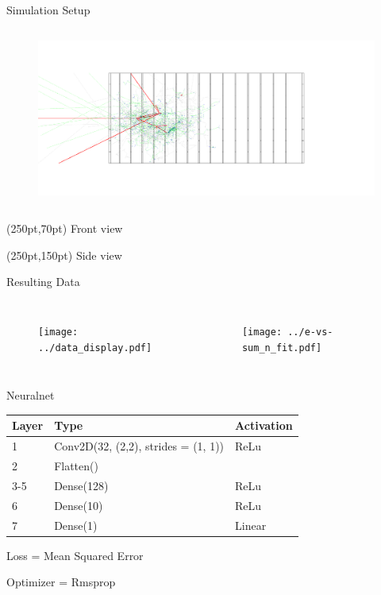 \documentclass[10pt]{beamer}
\begin{document}
\begin{frame}{Simulation Setup}
\begin{columns}
\begin{figure}[htp]
      \includegraphics[width=1.1\textwidth]{side.png}
    \end{figure}
  \end{columns}
  \begin{textblock*}{100pt}(250pt,70pt)
    Front view
  \end{textblock*}
  \begin{textblock*}{100pt}(250pt,150pt)
    Side view
  \end{textblock*}
\end{frame}

\begin{frame}{Resulting Data}
  \begin{columns}
    \begin{figure}[htp]
      \texttt{[image: ../data\_display.pdf]}
    \end{figure}
    \begin{figure}[htp]
      \texttt{[image: ../e-vs-sum\_n\_fit.pdf]}
    \end{figure}
  \end{columns}
\end{frame}

\begin{frame}{Neuralnet}
  \begin{itemize*}
  \item 
    \begin{tabular}{l|l|l}
      Layer & Type                                & Activation \\ \hline
      1     & Conv2D(32, (2,2), strides = (1, 1)) & ReLu       \\
      2     & Flatten()                           &            \\
      3-5   & Dense(128)                          & ReLu       \\
      6     & Dense(10)                           & ReLu       \\
      7     & Dense(1)                            & Linear    
    \end{tabular}
  \item Loss = Mean Squared Error
  \item Optimizer = Rmsprop
  \end{itemize*}
\end{frame}
\end{document}
